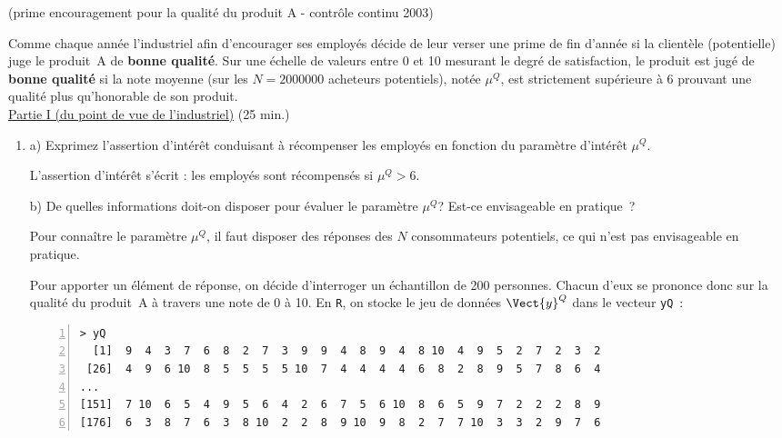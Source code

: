 \documentclass[10pt]{report}
\begin{document}
\begin{exercice} (prime encouragement pour la qualité du produit A - contrôle continu 2003)

Comme chaque ann{\'e}e l'industriel afin d'encourager ses employ{\'e}s d{\'e}cide de leur verser une prime de fin d'ann{\'e}e si la client{\`e}le (potentielle) juge le produit~A de \textbf{bonne qualit{\'e}}. Sur une {\'e}chelle de valeurs  entre 0 et 10 mesurant le degr{\'e} de satisfaction, le produit est jug{\'e} de \textbf{bonne qualit{\'e}} si la note moyenne (sur les $N=2000000$ acheteurs potentiels), not{\'e}e $\mu^Q$, est strictement sup{\'e}rieure {\`a} 6 prouvant une qualit{\'e} plus qu'honorable de son produit.\\
\noindent \underline{Partie I (du point de vue de l'industriel)} (25 min.) \\

\begin{enumerate}
\item a) Exprimez l'assertion d'int{\'e}r{\^e}t conduisant {\`a} r{\'e}compenser les employ{\'e}s en fonction du param{\`e}tre d'int{\'e}r{\^e}t $\mu^Q$. \\


\begin{Correction}
L'assertion d'intérêt s'écrit : les employés sont récompensés si $\mu^Q>6$.
\end{Correction}


b) De quelles informations doit-on disposer pour {\'e}valuer le param{\`e}tre $\mu^Q$? Est-ce envisageable en pratique~?


\begin{Correction}
Pour connaître le paramètre $\mu^Q$, il faut disposer des réponses des $N$ consommateurs potentiels, ce qui n'est pas envisageable en pratique. 
\end{Correction}



Pour apporter un {\'e}l{\'e}ment de r{\'e}ponse, on d{\'e}cide d'interroger un {\'e}chantillon de 200 personnes. Chacun d'eux se prononce donc sur la qualit{\'e} du produit~A {\`a} travers une note de 0 {\`a} 10. En \texttt{R}, on stocke le jeu de donn{\'e}es $\Vect{y}^Q$ dans le vecteur \texttt{yQ}~:

\begin{Verbatim}[frame=leftline,fontfamily=tt,fontshape=n,numbers=left]
> yQ
  [1]  9  4  3  7  6  8  2  7  3  9  9  4  8  9  4  8 10  4  9  5  2  7  2  3  2
 [26]  4  9  6 10  8  5  5  5  5 10  7  4  4  4  4  6  8  2  8  9  5  7  8  6  4
...
[151]  7 10  6  5  4  9  5  6  4  2  6  7  5  6 10  8  6  5  9  7  2  2  2  8  9
[176]  6  3  8  7  6  3  8 10  2  2  8  9 10  9  8  2  7  7 10  3  3  2  9  7  6
\end{Verbatim}


\end{enumerate}
\end{exercice}
\end{document}
